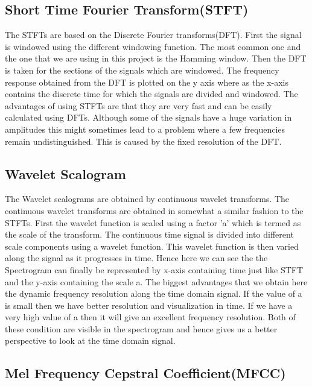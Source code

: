 \documentclass[conference]{IEEEtran}
\begin{document}
\subsection{Short Time Fourier Transform(STFT)}

The STFTs are based on the Discrete Fourier transforms(DFT). First the signal is windowed using the different windowing function. The most common one and the one that we are using in this project is the Hamming window. Then the DFT is taken for the sections of the signals which are windowed. The frequency response obtained from the DFT is plotted on the y axis where as the x-axis contains the discrete time for which the signals are divided and windowed. The advantages of using STFTs are that they are very fast and can be easily calculated using DFTs. Although some of the signals have a huge variation in amplitudes this might sometimes lead to a problem where a few frequencies remain undistinguished. This is caused by the fixed resolution of the DFT.

\subsection{Wavelet Scalogram}

The Wavelet scalograms are obtained by continuous wavelet transforms. The continuous wavelet transforms are obtained in somewhat a similar fashion to the STFTs. First the wavelet function is scaled using a factor 'a' which is termed as the scale of the transform. The continuous time signal is divided into different scale components using a wavelet function. This wavelet function is then varied along the signal as it progresses in time. Hence here we can see the the Spectrogram can finally be represented by x-axis containing time just like STFT and the y-axis containing the scale a. The biggest advantages that we obtain here the dynamic frequency resolution along the time domain signal. If the value of a is small then we have better resolution and visualization in time. If we have a very high value of a then it will give an excellent frequency resolution. Both of these condition are visible in the spectrogram and hence gives us a better perspective to look at the time domain signal.

\subsection{Mel Frequency Cepstral Coefficient(MFCC)}
\end{document}
